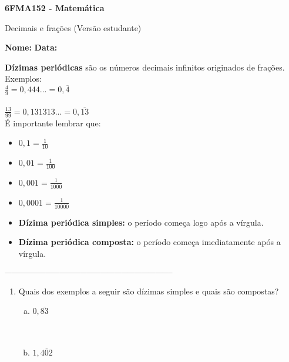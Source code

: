 \documentclass[a4paper,14pt]{article}
\begin{document}
	
	\noindent\textbf{6FMA152 - Matemática} 
	
	\begin{center}Decimais e frações (Versão estudante)
	\end{center}
	
	\noindent\textbf{Nome:} \underline{\hspace{10cm}}
	\noindent\textbf{Data:} \underline{\hspace{4cm}}
	
	
	\begin{multicols}{2}
	    \noindent \textbf{Dízimas periódicas} são os números decimais infinitos originados de frações. Exemplos: \\
	    $\frac{4}{9} = 0,444... = 0,\overline{4}$ \\\\
	    $\frac{13}{99} = 0,131313... = 0,\overline{13}$ \\
	    É importante lembrar que: \\
	    \begin{itemize}
	    	\item $0,1 = \frac{1}{10}$
	    	\item $0,01 = \frac{1}{100}$
	    	\item $0,001 = \frac{1}{1000}$
	    	\item $0,0001 = \frac{1}{10 000}$
	    	\item \textbf{Dízima periódica simples: } o período começa logo após a vírgula.
	    	\item \textbf{Dízima periódica composta: } o período começa imediatamente após a vírgula. \\
	    \end{itemize}
		\noindent\textsubscript{--------------------------------------------------------------------------}
		\begin{enumerate} 
			\item Quais dos exemplos a seguir são dízimas simples e quais são compostas?
			\begin{enumerate}[a)]
				\item $0,\overline{83}$ \\\\\\
				\item $1,\overline{402}$ \\\\\\

\end{enumerate}
\end{enumerate}
\end{multicols}
\end{document}
